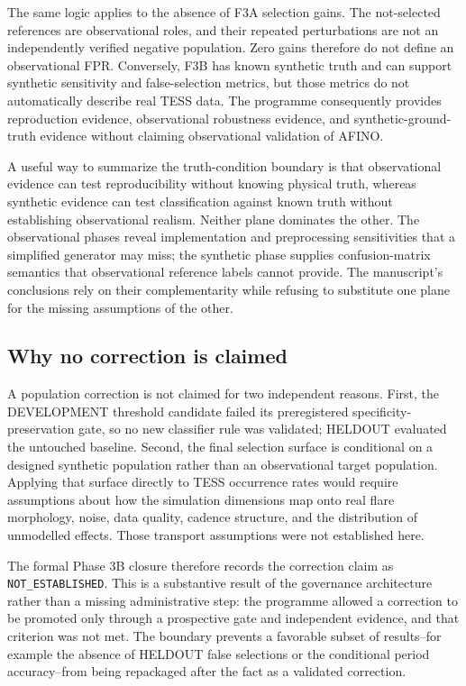 \documentclass[11pt,a4paper]{article}
\begin{document}
The same logic applies to the absence of F3A selection gains. The not-selected references are observational roles, and their repeated perturbations are not an independently verified negative population. Zero gains therefore do not define an observational FPR. Conversely, F3B has known synthetic truth and can support synthetic sensitivity and false-selection metrics, but those metrics do not automatically describe real TESS data. The programme consequently provides reproduction evidence, observational robustness evidence, and synthetic-ground-truth evidence without claiming observational validation of AFINO.

A useful way to summarize the truth-condition boundary is that observational evidence can test reproducibility without knowing physical truth, whereas synthetic evidence can test classification against known truth without establishing observational realism. Neither plane dominates the other. The observational phases reveal implementation and preprocessing sensitivities that a simplified generator may miss; the synthetic phase supplies confusion-matrix semantics that observational reference labels cannot provide. The manuscript's conclusions rely on their complementarity while refusing to substitute one plane for the missing assumptions of the other.

\subsection{Why no correction is claimed}
A population correction is not claimed for two independent reasons. First, the DEVELOPMENT threshold candidate failed its preregistered specificity-preservation gate, so no new classifier rule was validated; HELDOUT evaluated the untouched baseline. Second, the final selection surface is conditional on a designed synthetic population rather than an observational target population. Applying that surface directly to TESS occurrence rates would require assumptions about how the simulation dimensions map onto real flare morphology, noise, data quality, cadence structure, and the distribution of unmodelled effects. Those transport assumptions were not established here.

The formal Phase 3B closure therefore records the correction claim as \texttt{NOT\_ESTABLISHED}. This is a substantive result of the governance architecture rather than a missing administrative step: the programme allowed a correction to be promoted only through a prospective gate and independent evidence, and that criterion was not met. The boundary prevents a favorable subset of results--for example the absence of HELDOUT false selections or the conditional period accuracy--from being repackaged after the fact as a validated correction.
\end{document}
